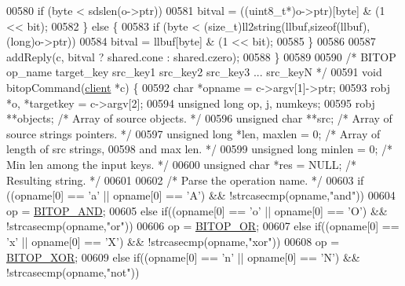\begin{DoxyCode}
{00580         \textcolor{keywordflow}{if} (byte < sdslen(o->ptr))
00581             bitval = ((uint8\_t*)o->ptr)[byte] & (1 << bit);
00582     \} \textcolor{keywordflow}{else} \{
00583         \textcolor{keywordflow}{if} (byte < (size\_t)ll2string(llbuf,\textcolor{keyword}{sizeof}(llbuf),(\textcolor{keywordtype}{long})o->ptr))
00584             bitval = llbuf[byte] & (1 << bit);
00585     \}
00586 
00587     addReply(c, bitval ? shared.cone : shared.czero);
00588 \}
00589 
00590 \textcolor{comment}{/* BITOP op\_name target\_key src\_key1 src\_key2 src\_key3 ... src\_keyN */}
00591 \textcolor{keywordtype}{void} bitopCommand(\hyperlink{structclient}{client} *c) \{
00592     \textcolor{keywordtype}{char} *opname = c->argv[1]->ptr;
00593     robj *o, *targetkey = c->argv[2];
00594     \textcolor{keywordtype}{unsigned} \textcolor{keywordtype}{long} op, j, numkeys;
00595     robj **objects;      \textcolor{comment}{/* Array of source objects. */}
00596     \textcolor{keywordtype}{unsigned} \textcolor{keywordtype}{char} **src; \textcolor{comment}{/* Array of source strings pointers. */}
00597     \textcolor{keywordtype}{unsigned} \textcolor{keywordtype}{long} *len, maxlen = 0; \textcolor{comment}{/* Array of length of src strings,}
00598 \textcolor{comment}{                                       and max len. */}
00599     \textcolor{keywordtype}{unsigned} \textcolor{keywordtype}{long} minlen = 0;    \textcolor{comment}{/* Min len among the input keys. */}
00600     \textcolor{keywordtype}{unsigned} \textcolor{keywordtype}{char} *res = NULL; \textcolor{comment}{/* Resulting string. */}
00601 
00602     \textcolor{comment}{/* Parse the operation name. */}
00603     \textcolor{keywordflow}{if} ((opname[0] == \textcolor{stringliteral}{'a'} || opname[0] == \textcolor{stringliteral}{'A'}) && !strcasecmp(opname,\textcolor{stringliteral}{"and"}))
00604         op = \hyperlink{bitops_8c_adb2b31ac9285af6d27408c81c4a1a637}{BITOP\_AND};
00605     \textcolor{keywordflow}{else} \textcolor{keywordflow}{if}((opname[0] == \textcolor{stringliteral}{'o'} || opname[0] == \textcolor{stringliteral}{'O'}) && !strcasecmp(opname,\textcolor{stringliteral}{"or"}))
00606         op = \hyperlink{bitops_8c_a3877788c36f67d63804710ce8a80d100}{BITOP\_OR};
00607     \textcolor{keywordflow}{else} \textcolor{keywordflow}{if}((opname[0] == \textcolor{stringliteral}{'x'} || opname[0] == \textcolor{stringliteral}{'X'}) && !strcasecmp(opname,\textcolor{stringliteral}{"xor"}))
00608         op = \hyperlink{bitops_8c_a29fde80dd21281f9ada69d9e65109d14}{BITOP\_XOR};
00609     \textcolor{keywordflow}{else} \textcolor{keywordflow}{if}((opname[0] == \textcolor{stringliteral}{'n'} || opname[0] == \textcolor{stringliteral}{'N'}) && !strcasecmp(opname,\textcolor{stringliteral}{"not"}))
}
\end{DoxyCode}
